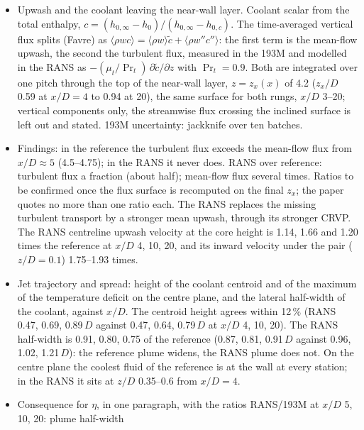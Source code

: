 \documentclass[10pt]{article}
\begin{document}
\begin{itemize}
  0.021 at $x/D$ 3 and 4 (peak 0.48 at $x/D=4$) and is gone from $x/D=5$, where the vorticity is a wall-attached
  layer. A weaker vortex of the same sign as the CRVP lies further outboard in the RANS at $x/D=4$; in the 193M
  it is at the noise floor of the mean field and is not named or quantified. The asymmetry of the 193M is stated
  with the record length.
\item Upwash and the coolant leaving the near-wall layer. Coolant scalar from the total enthalpy,
  $c=(h_{0,\infty}-h_0)/(h_{0,\infty}-h_{0,c})$. The time-averaged vertical flux splits (Favre) as
  $\langle\rho wc\rangle=\langle\rho w\rangle\tilde c+\langle\rho w''c''\rangle$: the first term is the mean-flow
  upwash, the second the turbulent flux, measured in the 193M and modelled in the RANS as
  $-(\mu_t/\Pr_t)\,\partial\tilde c/\partial z$ with $\Pr_t=0.9$. Both are integrated over one pitch through the
  top of the near-wall layer, $z=z_x(x)$ of 4.2 ($z_x/D$ 0.59 at $x/D=4$ to 0.94 at 20), the same surface for
  both rungs, $x/D$ 3--20; vertical components only, the streamwise flux crossing the inclined surface is left
  out and stated. 193M uncertainty: jackknife over ten batches.
\item Findings: in the reference the turbulent flux exceeds the mean-flow flux from $x/D\approx5$ (4.5--4.75);
  in the RANS it never does. RANS over reference: turbulent flux a fraction (about half); mean-flow flux
  several times. Ratios to be confirmed once the flux surface is recomputed on the final $z_x$; the paper
  quotes no more than one ratio each. The RANS replaces the missing turbulent
  transport by a stronger mean upwash, through its stronger CRVP. The RANS centreline upwash velocity at the
  core height is 1.14, 1.66 and 1.20 times the reference at $x/D$ 4, 10, 20, and its inward velocity under the
  pair ($z/D=0.1$) 1.75--1.93 times.
\item Jet trajectory and spread: height of the coolant centroid and of the maximum of the temperature deficit on
  the centre plane, and the lateral half-width of the coolant, against $x/D$. The centroid height agrees within
  12\,\% (RANS 0.47, 0.69, 0.89\,$D$ against 0.47, 0.64, 0.79\,$D$ at $x/D$ 4, 10, 20). The RANS half-width is
  0.91, 0.80, 0.75 of the reference (0.87, 0.81, 0.91\,$D$ against 0.96, 1.02, 1.21\,$D$): the reference plume
  widens, the RANS plume does not. On the centre plane the coolest fluid of the reference is at the wall at every
  station; in the RANS it sits at $z/D$ 0.35--0.6 from $x/D=4$.
\item Consequence for $\eta$, in one paragraph, with the ratios RANS/193M at $x/D$ 5, 10, 20: plume half-width

\end{itemize}
\end{document}
